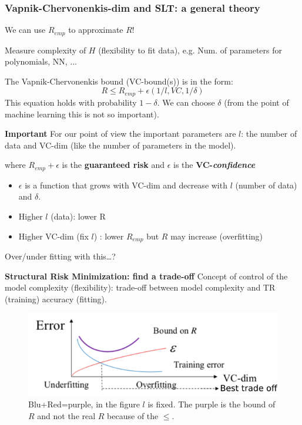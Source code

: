 \documentclass[../main.tex]{subfiles}
\begin{document}
\subsubsection*{Vapnik-Chervonenkis-dim and SLT: a general theory}%
We can use $R_{emp}$ to approximate $R$!

\begin{definition}[VC-dim]
    Measure complexity of $H$ (flexibility to fit data), e.g. Num. of parameters for polynomials, NN, ...
\end{definition}

The Vapnik-Chervonenkis bound (VC-bound(s)) is in the form:
\[
R \leq R_{emp} + \epsilon(1/l, VC, 1/\delta)
\]
This equation holds with probability $1-\delta$. We can choose $\delta$ (from the point of machine learning this is not so important).

\textbf{Important} For our point of view the important parameters are $l$: the number of data and VC-dim (like the number of parameters in the model).

where $R_{emp} + \epsilon$ is the \textbf{guaranteed risk} and $\epsilon$ is the \textbf{VC-\textit{confidence}} 
\begin{itemize}
    \item $\epsilon$ is a function that grows with VC-dim and decrease with $l$ (number of data) and $\delta$.
    \item Higher $l$ (data): lower R 
    \item Higher VC-dim (fix $l$) : lower $R_{emp}$ but $R$ may increase (overfitting)
\end{itemize}

Over/under fitting with this\ldots?

\noindent\textbf{Structural Risk Minimization: find a trade-off}
Concept of control of the model complexity (flexibility): trade-off between model complexity and TR (training) accuracy (fitting).
\begin{figure}[H]
    \centering
    \includegraphics[scale = 0.4]{lectures/1_Introduction/intro_struct_risk.png}
    \caption{\scriptsize Blu+Red=purple, in the figure $l$ is fixed. The purple is the bound of $R$ and not the real $R$ because of the $\le$.}
\end{figure}
\end{document}
